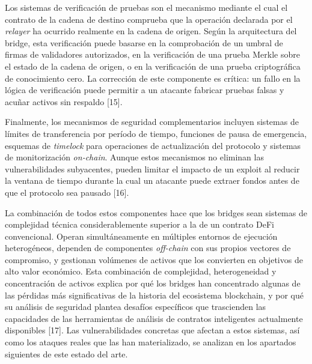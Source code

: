 Los sistemas de verificación de pruebas son el mecanismo mediante el
cual el contrato de la cadena de destino comprueba que la operación
declarada por el \emph{relayer} ha ocurrido realmente en la cadena de
origen. Según la arquitectura del bridge, esta verificación puede
basarse en la comprobación de un umbral de firmas de validadores
autorizados, en la verificación de una prueba Merkle sobre el estado de
la cadena de origen, o en la verificación de una prueba criptográfica de
conocimiento cero. La corrección de este componente es crítica: un fallo
en la lógica de verificación puede permitir a un atacante fabricar
pruebas falsas y acuñar activos sin respaldo {[}15{]}.

Finalmente, los mecanismos de seguridad complementarios incluyen
sistemas de límites de transferencia por período de tiempo, funciones de
pausa de emergencia, esquemas de \emph{timelock} para operaciones de
actualización del protocolo y sistemas de monitorización
\emph{on-chain}. Aunque estos mecanismos no eliminan las
vulnerabilidades subyacentes, pueden limitar el impacto de un exploit al
reducir la ventana de tiempo durante la cual un atacante puede extraer
fondos antes de que el protocolo sea pausado {[}16{]}.

La combinación de todos estos componentes hace que los bridges sean
sistemas de complejidad técnica considerablemente superior a la de un
contrato DeFi convencional. Operan simultáneamente en múltiples entornos
de ejecución heterogéneos, dependen de componentes \emph{off-chain} con
sus propios vectores de compromiso, y gestionan volúmenes de activos que
los convierten en objetivos de alto valor económico. Esta combinación de
complejidad, heterogeneidad y concentración de activos explica por qué
los bridges han concentrado algunas de las pérdidas más significativas
de la historia del ecosistema blockchain, y por qué su análisis de
seguridad plantea desafíos específicos que trascienden las capacidades
de las herramientas de análisis de contratos inteligentes actualmente
disponibles {[}17{]}. Las vulnerabilidades concretas que afectan a estos
sistemas, así como los ataques reales que las han materializado, se
analizan en los apartados siguientes de este estado del arte.
